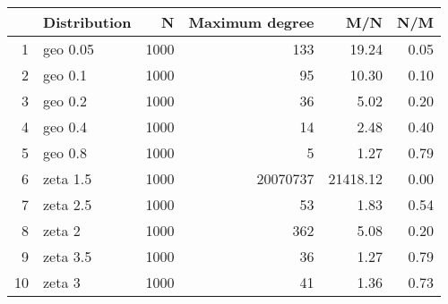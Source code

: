 \begin{table}[ht]
\centering
\begin{tabular}{rlrrrr}
  \hline
 & Distribution & N & Maximum degree & M/N & N/M \\ 
  \hline
1 & geo 0.05 & 1000 & 133 & 19.24 & 0.05 \\ 
  2 & geo 0.1 & 1000 &  95 & 10.30 & 0.10 \\ 
  3 & geo 0.2 & 1000 &  36 & 5.02 & 0.20 \\ 
  4 & geo 0.4 & 1000 &  14 & 2.48 & 0.40 \\ 
  5 & geo 0.8 & 1000 &   5 & 1.27 & 0.79 \\ 
  6 & zeta 1.5 & 1000 & 20070737 & 21418.12 & 0.00 \\ 
  7 & zeta 2.5 & 1000 &  53 & 1.83 & 0.54 \\ 
  8 & zeta 2 & 1000 & 362 & 5.08 & 0.20 \\ 
  9 & zeta 3.5 & 1000 &  36 & 1.27 & 0.79 \\ 
  10 & zeta 3 & 1000 &  41 & 1.36 & 0.73 \\ 
   \hline
\end{tabular}
\end{table}
